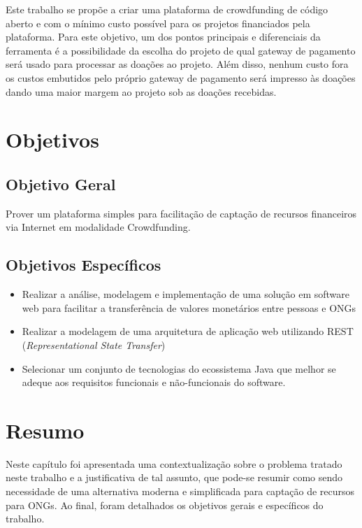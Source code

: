 Este trabalho se propõe a criar uma plataforma de crowdfunding de código aberto e com o mínimo custo possível para os projetos financiados pela plataforma. Para este objetivo, um dos pontos principais e diferenciais da ferramenta é a possibilidade da escolha do projeto de qual gateway de pagamento será usado para processar as doações ao projeto. Além disso, nenhum custo fora os custos embutidos pelo próprio gateway de pagamento será impresso às doações dando uma maior margem ao projeto sob as doações recebidas.



\section{Objetivos}
\subsection{Objetivo Geral}
Prover um plataforma simples para facilitação de captação de recursos financeiros via Internet em modalidade Crowdfunding.

\subsection{Objetivos Específicos}
\begin{itemize}
  \item Realizar a análise, modelagem e implementação de uma solução em software web para facilitar a transferência de valores monetários entre pessoas e ONGs
  \item Realizar a modelagem de uma arquitetura de aplicação web utilizando REST (\emph{Representational State Transfer})
  \item Selecionar um conjunto de tecnologias do ecossistema Java que melhor se adeque aos requisitos funcionais e não-funcionais do software.
\end{itemize}



\section*{Resumo}
Neste capítulo foi apresentada uma contextualização sobre o problema tratado neste trabalho e a justificativa de tal assunto, que pode-se resumir como sendo necessidade de uma alternativa moderna e simplificada para captação de recursos para ONGs. Ao final, foram detalhados os objetivos gerais e específicos do trabalho.


